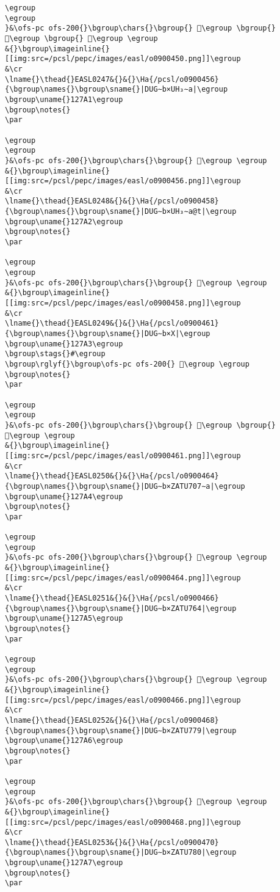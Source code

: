 \begin{verbatim}
\egroup
\egroup
}&\ofs-pc ofs-200{}\bgroup\chars{}\bgroup{} 𒞶\egroup \bgroup{} 𒞺\egroup \bgroup{} 𒞠\egroup \egroup
&{}\bgroup\imageinline{}[[img:src=/pcsl/pepc/images/easl/o0900450.png]]\egroup
&\cr
\lname{}\thead{}EASL0247&{}&{}\Ha{/pcsl/o0900456}{\bgroup\names{}\bgroup\sname{}|DUG∼b×UH₃∼a|\egroup
\bgroup\uname{}127A1\egroup
\bgroup\notes{}
\par 

\egroup
\egroup
}&\ofs-pc ofs-200{}\bgroup\chars{}\bgroup{} 𒞡\egroup \egroup
&{}\bgroup\imageinline{}[[img:src=/pcsl/pepc/images/easl/o0900456.png]]\egroup
&\cr
\lname{}\thead{}EASL0248&{}&{}\Ha{/pcsl/o0900458}{\bgroup\names{}\bgroup\sname{}|DUG∼b×UH₃∼a@t|\egroup
\bgroup\uname{}127A2\egroup
\bgroup\notes{}
\par 

\egroup
\egroup
}&\ofs-pc ofs-200{}\bgroup\chars{}\bgroup{} 𒞢\egroup \egroup
&{}\bgroup\imageinline{}[[img:src=/pcsl/pepc/images/easl/o0900458.png]]\egroup
&\cr
\lname{}\thead{}EASL0249&{}&{}\Ha{/pcsl/o0900461}{\bgroup\names{}\bgroup\sname{}|DUG∼b×X|\egroup
\bgroup\uname{}127A3\egroup
\bgroup\stags{}#\egroup
\bgroup\rglyf{}\bgroup\ofs-pc ofs-200{} 𒞣\egroup \egroup
\bgroup\notes{}
\par 

\egroup
\egroup
}&\ofs-pc ofs-200{}\bgroup\chars{}\bgroup{} 𒞷\egroup \bgroup{} 𒞣\egroup \egroup
&{}\bgroup\imageinline{}[[img:src=/pcsl/pepc/images/easl/o0900461.png]]\egroup
&\cr
\lname{}\thead{}EASL0250&{}&{}\Ha{/pcsl/o0900464}{\bgroup\names{}\bgroup\sname{}|DUG∼b×ZATU707∼a|\egroup
\bgroup\uname{}127A4\egroup
\bgroup\notes{}
\par 

\egroup
\egroup
}&\ofs-pc ofs-200{}\bgroup\chars{}\bgroup{} 𒞤\egroup \egroup
&{}\bgroup\imageinline{}[[img:src=/pcsl/pepc/images/easl/o0900464.png]]\egroup
&\cr
\lname{}\thead{}EASL0251&{}&{}\Ha{/pcsl/o0900466}{\bgroup\names{}\bgroup\sname{}|DUG∼b×ZATU764|\egroup
\bgroup\uname{}127A5\egroup
\bgroup\notes{}
\par 

\egroup
\egroup
}&\ofs-pc ofs-200{}\bgroup\chars{}\bgroup{} 𒞥\egroup \egroup
&{}\bgroup\imageinline{}[[img:src=/pcsl/pepc/images/easl/o0900466.png]]\egroup
&\cr
\lname{}\thead{}EASL0252&{}&{}\Ha{/pcsl/o0900468}{\bgroup\names{}\bgroup\sname{}|DUG∼b×ZATU779|\egroup
\bgroup\uname{}127A6\egroup
\bgroup\notes{}
\par 

\egroup
\egroup
}&\ofs-pc ofs-200{}\bgroup\chars{}\bgroup{} 𒞦\egroup \egroup
&{}\bgroup\imageinline{}[[img:src=/pcsl/pepc/images/easl/o0900468.png]]\egroup
&\cr
\lname{}\thead{}EASL0253&{}&{}\Ha{/pcsl/o0900470}{\bgroup\names{}\bgroup\sname{}|DUG∼b×ZATU780|\egroup
\bgroup\uname{}127A7\egroup
\bgroup\notes{}
\par 


\end{verbatim}
